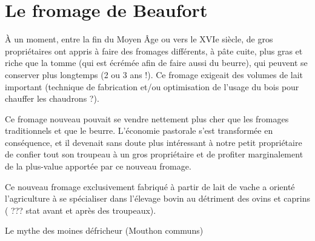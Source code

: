 \documentclass[12pt,a4paper]{report}
\begin{document}
\section{Le fromage de Beaufort}
	
		À un moment, entre la fin du Moyen Âge ou vers le XVIe siècle, de gros propriétaires ont appris à faire des fromages différents, à pâte cuite, plus gras et riche que la tomme (qui est écrémée afin de faire aussi du beurre), qui peuvent se conserver plus longtemps (2 ou 3 ans !). Ce fromage exigeait des volumes de lait important (technique de fabrication et/ou optimisation de l’usage du bois pour chauffer les chaudrons ?).
	
	Ce fromage nouveau pouvait se vendre nettement plus cher que les fromages traditionnels et que le beurre. L’économie pastorale s’est transformée en conséquence, et il devenait sans doute plus intéressant à notre petit propriétaire de confier tout son troupeau à un gros propriétaire et de profiter marginalement de la plus-value apportée par ce nouveau fromage.
	
	Ce nouveau fromage exclusivement fabriqué à partir de lait de vache a orienté l’agriculture à se spécialiser dans l’élevage bovin au détriment des ovins et caprins ( ??? stat avant et après des troupeaux).
	
	Le mythe des moines défricheur (Mouthon communs)
	
\end{document}
